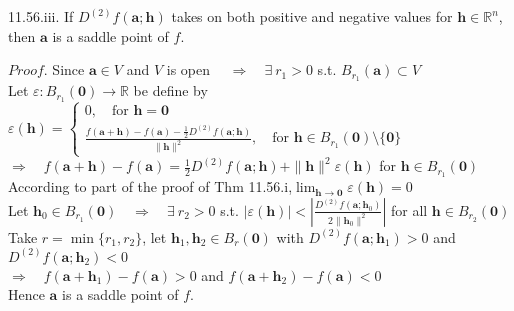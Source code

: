 \documentclass[12pt]{book}
\begin{document}
\begin{CJK}{UTF8}{bsmi}
11.56.iii. If $D^{(2)}f(\mathbf{a};\mathbf{h})$ takes on both positive and negative values for $\mathbf{h}\in\mathbb{R}^n$, then $\mathbf{a}$ is a saddle point of $f$. 

$Proof$. Since $\mathbf{a}\in V$ and $V$ is open $\quad\Rightarrow\quad\exists\ r_1>0$ s.t. $B_{r_1}(\mathbf{a})\subset V$ \\
Let $\varepsilon : B_{r_1}(\mathbf{0})\rightarrow\mathbb{R}$ be define by $\displaystyle\varepsilon(\mathbf{h})=\left\{\begin{matrix}
0,\quad\text{for\ }\mathbf{h}=\mathbf{0} \\
\displaystyle\frac{f(\mathbf{a}+\mathbf{h})-f(\mathbf{a})-\frac{1}{2}D^{(2)}f(\mathbf{a};\mathbf{h})}{\parallel\mathbf{h}\parallel^2},\quad\text{for\ }\mathbf{h}\in B_{r_1}(\mathbf{0})\setminus\{\mathbf{0}\}
\end{matrix}\right.$ \\
$\displaystyle\Rightarrow\quad f(\mathbf{a}+\mathbf{h})-f(\mathbf{a})=\frac{1}{2}D^{(2)}f(\mathbf{a};\mathbf{h})+\parallel\mathbf{h}\parallel^2\varepsilon(\mathbf{h})$ for $\mathbf{h}\in B_{r_1}(\mathbf{0})$ \\
According to part of the proof of Thm 11.56.i,\quad  $\displaystyle\lim_{\mathbf{h}\rightarrow\mathbf{0}}\varepsilon(\mathbf{h})=0$ \\
Let $\mathbf{h}_0\in B_{r_1}(\mathbf{0})\quad\Rightarrow\quad\exists\ r_2>0$ s.t. $\displaystyle|\varepsilon(\mathbf{h})|<|\frac{D^{(2)}f(\mathbf{a};\mathbf{h}_0)}{2\parallel\mathbf{h}_0\parallel^2}|$ for all $\mathbf{h}\in B_{r_2}(\mathbf{0})$ \\
Take $r=\min\{r_1, r_2\}$, let $\mathbf{h}_1, \mathbf{h}_2\in B_r(\mathbf{0})$ with $D^{(2)}f(\mathbf{a};\mathbf{h}_1)>0$ and $D^{(2)}f(\mathbf{a};\mathbf{h}_2)<0$ \\
$\Rightarrow\quad f(\mathbf{a}+\mathbf{h}_1)-f(\mathbf{a})>0$ and $f(\mathbf{a}+\mathbf{h}_2)-f(\mathbf{a})<0$ \\
Hence $\mathbf{a}$ is a saddle point of $f$.

\end{CJK}
\end{document}

